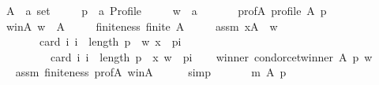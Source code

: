 \begin{isabellebody}
\ \ \ \ A\ {\isacharcolon}{\kern0pt}{\isacharcolon}{\kern0pt}\ {\isachardoublequoteopen}{\isacharprime}{\kern0pt}a\ set{\isachardoublequoteclose}\ \isanewline
\ \ \ \ p\ {\isacharcolon}{\kern0pt}{\isacharcolon}{\kern0pt}\ {\isachardoublequoteopen}{\isacharprime}{\kern0pt}a\ Profile{\isachardoublequoteclose}\ \isanewline
\ \ \ \ w\ {\isacharcolon}{\kern0pt}{\isacharcolon}{\kern0pt}\ {\isachardoublequoteopen}{\isacharprime}{\kern0pt}a{\isachardoublequoteclose}\isanewline
\ \ \isamarkupfalse%
\isanewline
\ \ \ \ prof{\isacharunderscore}{\kern0pt}A{\isacharcolon}{\kern0pt}\ {\isachardoublequoteopen}profile\ A\ p{\isachardoublequoteclose}\ \isanewline
\ \ \ \ w{\isacharunderscore}{\kern0pt}in{\isacharunderscore}{\kern0pt}A{\isacharcolon}{\kern0pt}\ {\isachardoublequoteopen}w\ {\isasymin}\ A{\isachardoublequoteclose}\ \isanewline
\ \ \ \ finiteness{\isacharcolon}{\kern0pt}\ {\isachardoublequoteopen}finite\ A{\isachardoublequoteclose}\ \isanewline
\ \ \ \ assm{\isacharcolon}{\kern0pt}\ {\isachardoublequoteopen}{\isasymforall}x{\isasymin}A\ {\isacharminus}{\kern0pt}\ {\isacharbraceleft}{\kern0pt}w{\isacharbraceright}{\kern0pt}{\isachardot}{\kern0pt}\isanewline
\ \ \ \ \ \ \ \ \ \ card\ {\isacharbraceleft}{\kern0pt}i{\isachardot}{\kern0pt}\ i\ {\isacharless}{\kern0pt}\ length\ p\ {\isasymand}\ {\isacharparenleft}{\kern0pt}w{\isacharcomma}{\kern0pt}\ x{\isacharparenright}{\kern0pt}\ {\isasymin}\ {\isacharparenleft}{\kern0pt}p{\isacharbang}{\kern0pt}i{\isacharparenright}{\kern0pt}{\isacharbraceright}{\kern0pt}\ {\isacharless}{\kern0pt}\isanewline
\ \ \ \ \ \ \ \ \ \ \ \ card\ {\isacharbraceleft}{\kern0pt}i{\isachardot}{\kern0pt}\ i\ {\isacharless}{\kern0pt}\ length\ p\ {\isasymand}\ {\isacharparenleft}{\kern0pt}x{\isacharcomma}{\kern0pt}\ w{\isacharparenright}{\kern0pt}\ {\isasymin}\ {\isacharparenleft}{\kern0pt}p{\isacharbang}{\kern0pt}i{\isacharparenright}{\kern0pt}{\isacharbraceright}{\kern0pt}{\isachardoublequoteclose}\isanewline
\ \ \isamarkupfalse%
\ winner{\isacharcolon}{\kern0pt}\ {\isachardoublequoteopen}condorcet{\isacharunderscore}{\kern0pt}winner\ A\ p\ w{\isachardoublequoteclose}\isanewline
\ \ \ \ \isamarkupfalse%
\ assm\ finiteness\ prof{\isacharunderscore}{\kern0pt}A\ w{\isacharunderscore}{\kern0pt}in{\isacharunderscore}{\kern0pt}A\isanewline
\ \ \ \ \isamarkupfalse%
\ simp\isanewline
\ \ \isamarkupfalse%
\isanewline
\ \ \ \ {\isachardoublequoteopen}m\ A\ p\ {\isacharequal}{\kern0pt}\isanewline

\end{isabellebody}
